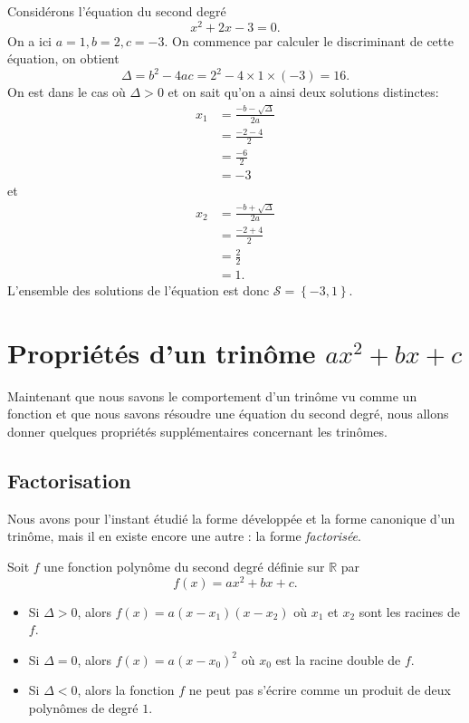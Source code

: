 \documentclass[11pt]{article}
\begin{document}
\begin{exemple}
  Considérons l'équation du second degré
  \[
    x^2+2x-3 = 0.
  \]
  On a ici $a=1, b=2, c=-3$. On commence par calculer le discriminant de cette
  équation, on obtient
  \[
    \Delta = b^2-4ac = 2^2 - 4\times1\times(-3)=16.
  \]
  On est dans le cas où $\Delta>0$ et on sait qu'on a ainsi deux solutions
  distinctes:
  \begin{align*}
    x_1 &= \frac{-b-\sqrt\Delta}{2a} \\
    &= \frac{-2-4}{2}\\
    &= \frac{-6}{2}\\
    &= -3
  \end{align*}
  et
  \begin{align*}
    x_2 &= \frac{-b+\sqrt\Delta}{2a} \\
    &= \frac{-2+4}{2}\\
    &= \frac{2}{2}\\
    &= 1.
  \end{align*}
  L'ensemble des solutions de l'équation est donc $\mathscr S = \left\{ -3, 1
  \right\}$.
\end{exemple}

\section{Propriétés d'un trinôme $ax^2+bx+c$}

Maintenant que nous savons le comportement d'un trinôme vu comme un fonction et
que nous savons résoudre une équation du second degré, nous allons donner
quelques propriétés supplémentaires concernant les trinômes.

\subsection{Factorisation}

Nous avons pour
l'instant étudié la forme développée et la forme canonique d'un trinôme, mais il
en existe encore une autre : la forme \emph{factorisée}.

\begin{prop}
  Soit $f$ une fonction polynôme du second degré définie sur $\mathbb{R}$ par
  \[
    f(x) = ax^2+bx+c.
  \]
  \begin{itemize}
    \item Si $\Delta>0$, alors $f(x)=a(x-x_1)(x-x_2)$ où $x_1$ et $x_2$ sont les
      racines de $f$.
    \item Si $\Delta=0$, alors $f(x)=a(x-x_0)^2$ où $x_0$ est la racine double de
      $f$.
    \item Si $\Delta<0$, alors la fonction $f$ ne peut pas s'écrire comme un
      produit de deux polynômes de degré $1$.
  \end{itemize}
\end{prop}
\end{document}
